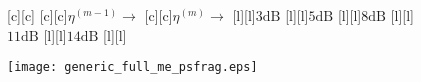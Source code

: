 \documentclass{article}
\begin{document}
\begin{figure}[htb]
  \begin{center}

        [c][c]{}
        [c][c]{$\eta^{(m-1)}\rightarrow$}
        [c][c]{$\eta^{(m)}\rightarrow$}
        [l][l]{$\mathrm{3dB}$}
        [l][l]{$\mathrm{5dB}$}
	[l]{$\mathrm{8dB}$}
	[l]{$\mathrm{11dB}$}
        [l][l]{$\mathrm{14dB}$}
	[l]{$\mathrm{}$}	       
	
    \texttt{[image: generic\_full\_me\_psfrag.eps]}
    \end{center}
\end{figure}
\end{document}
